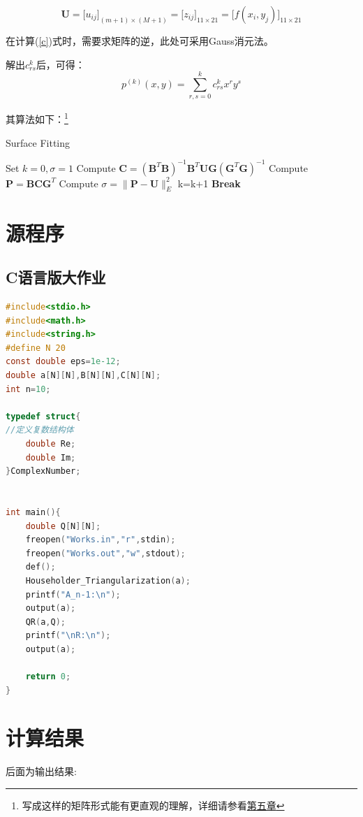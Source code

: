 \[\bm{U} =
\big[u_{ij}\big]_{(m+1)\times (M+1)}=
\big[z_{ij}\big]_{11\times 21}=
\big[f(x_i,y_j)\big]_{11\times 21}
\]

在计算(\ref{c})式时，需要求矩阵的逆，此处可采用Gauss消元法。

解出$c_{rs}^{k}$后，可得：
\[p^{(k)}(x,y) = \sum\limits_{r,s = 0}^k {{c_{rs}^{k}}{x^r}{y^s}} \]



其算法如下：\footnote{写成这样的矩阵形式能有更直观的理解，详细请参看\hyperref[sec:discuss]{第五章}}

\begin{algorithm}[h]  
\caption{Surface Fitting }  
\begin{algorithmic}[1]  
\STATE Set $k=0,\sigma=1$
\WHILE {$\sigma >\varepsilon$}
\STATE Compute $\bm{C}=(\bm{B}^T\bm{B})^{-1}\bm{B}^T\bm{U}\bm{G}(\bm{G}^T\bm{G})^{-1}$ 
\STATE Compute $\bm{P}=\bm{B}\bm{C}\bm{G}^T$ 
\STATE Compute $\sigma={\|{\bm{P}-\bm{U}}\|_{E}^2}$
\STATE k=k+1
\STATE \textbf{Break}
\ENDIF 
\ENDWHILE
\end{algorithmic}  
\end{algorithm}  

\newpage



\chapter{源程序}
\section{C语言版大作业}
\begin{lstlisting}[language=C]
#include<stdio.h>
#include<math.h>
#include<string.h>
#define N 20
const double eps=1e-12;
double a[N][N],B[N][N],C[N][N];
int n=10;

typedef struct{
//定义复数结构体
    double Re;
    double Im;
}ComplexNumber;


int main(){
	double Q[N][N];
	freopen("Works.in","r",stdin);
	freopen("Works.out","w",stdout);
	def();
	Householder_Triangularization(a);
	printf("A_n-1:\n");
	output(a);
	QR(a,Q);
	printf("\nR:\n");
	output(a);

	return 0;
}
\end{lstlisting}




\chapter{计算结果}
后面为输出结果:


